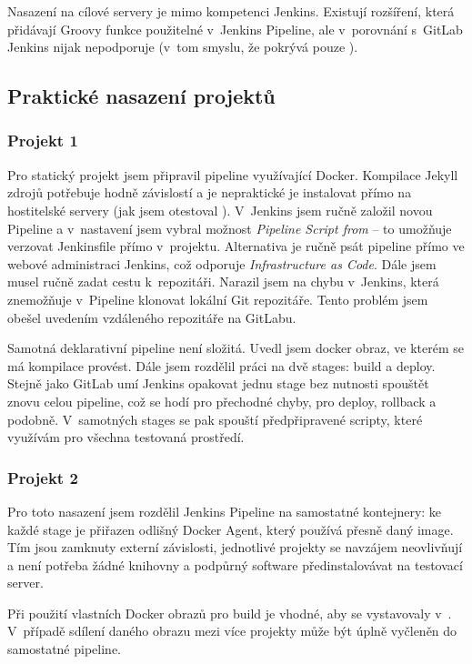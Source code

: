         Nasazení na cílové servery je mimo kompetenci Jenkins. Existují rozšíření, která přidávají Groovy funkce použitelné v~Jenkins Pipeline, ale v~porovnání s~GitLab Jenkins nijak \CD nepodporuje (v~tom smyslu, že pokrývá pouze \CI).

    \subsection{Praktické nasazení projektů}
        \subsubsection{Projekt 1}
            Pro statický projekt jsem připravil pipeline využívající Docker. Kompilace Jekyll zdrojů potřebuje hodně závislostí a je nepraktické je instalovat přímo na hostitelské servery (jak jsem otestoval ). V~Jenkins jsem ručně založil novou Pipeline a v~nastavení jsem vybral možnost \textit{Pipeline Script from } -- to umožňuje verzovat Jenkinsfile přímo v~projektu. Alternativa je ručně psát pipeline přímo ve webové administraci Jenkins, což odporuje \textit{Infrastructure as Code}. Dále jsem musel ručně zadat cestu k~repozitáři. Narazil jsem na chybu v~Jenkins, která znemožňuje v~Pipeline klonovat lokální Git repozitáře. Tento problém jsem obešel uvedením vzdáleného repozitáře na GitLabu.

            Samotná deklarativní pipeline není složitá. Uvedl jsem docker obraz, ve kterém se má kompilace provést. Dále jsem rozdělil práci na dvě stages: build a deploy. Stejně jako GitLab umí Jenkins opakovat jednu stage bez nutnosti spouštět znovu celou pipeline, což se hodí pro přechodné chyby, pro deploy, rollback a podobně. V~samotných stages se pak spouští předpřipravené scripty, které využívám pro všechna testovaná \CICD prostředí.

        \subsubsection{Projekt 2}
            Pro toto nasazení jsem rozdělil Jenkins Pipeline na samostatné kontejnery: ke každé stage je přiřazen odlišný Docker Agent, který používá přesně daný image. Tím jsou zamknuty externí závislosti, jednotlivé projekty se navzájem neovlivňují a není potřeba žádné knihovny a podpůrný software předinstalovávat na testovací server.

            Při použití vlastních Docker obrazů pro build je vhodné, aby se vystavovaly v~\CI. V~případě sdílení daného obrazu mezi více projekty může být úplně vyčleněn do samostatné pipeline.

